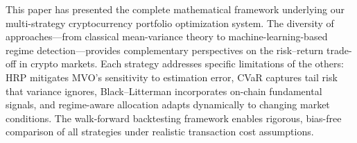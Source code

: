 \documentclass[12pt,a4paper]{article}
\begin{document}
This paper has presented the complete mathematical framework underlying our multi-strategy cryptocurrency portfolio optimization system. The diversity of approaches---from classical mean-variance theory to machine-learning-based regime detection---provides complementary perspectives on the risk--return trade-off in crypto markets. Each strategy addresses specific limitations of the others: HRP mitigates MVO's sensitivity to estimation error, CVaR captures tail risk that variance ignores, Black--Litterman incorporates on-chain fundamental signals, and regime-aware allocation adapts dynamically to changing market conditions. The walk-forward backtesting framework enables rigorous, bias-free comparison of all strategies under realistic transaction cost assumptions.

\end{document}
